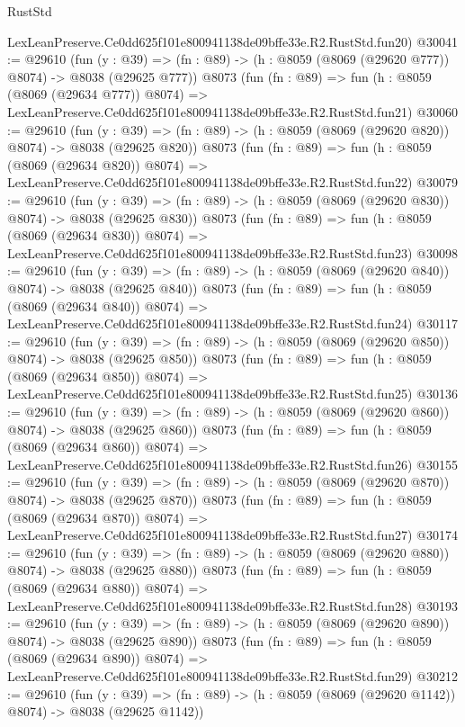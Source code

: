 \begin{lexlean}{RustStd}
\begin{coremodule}
    LexLeanPreserve.Ce0dd625f101e800941138de09bffe33e.R2.RustStd.fun20)
@30041 := @29610
    (fun (y : @39) => (fn : @89) -> (h : @8059 (@8069 (@29620 @777)) @8074) -> @8038 (@29625 @777))
    @8073
    (fun (fn : @89) =>
    fun (h : @8059 (@8069 (@29634 @777)) @8074) =>
    LexLeanPreserve.Ce0dd625f101e800941138de09bffe33e.R2.RustStd.fun21)
@30060 := @29610
    (fun (y : @39) => (fn : @89) -> (h : @8059 (@8069 (@29620 @820)) @8074) -> @8038 (@29625 @820))
    @8073
    (fun (fn : @89) =>
    fun (h : @8059 (@8069 (@29634 @820)) @8074) =>
    LexLeanPreserve.Ce0dd625f101e800941138de09bffe33e.R2.RustStd.fun22)
@30079 := @29610
    (fun (y : @39) => (fn : @89) -> (h : @8059 (@8069 (@29620 @830)) @8074) -> @8038 (@29625 @830))
    @8073
    (fun (fn : @89) =>
    fun (h : @8059 (@8069 (@29634 @830)) @8074) =>
    LexLeanPreserve.Ce0dd625f101e800941138de09bffe33e.R2.RustStd.fun23)
@30098 := @29610
    (fun (y : @39) => (fn : @89) -> (h : @8059 (@8069 (@29620 @840)) @8074) -> @8038 (@29625 @840))
    @8073
    (fun (fn : @89) =>
    fun (h : @8059 (@8069 (@29634 @840)) @8074) =>
    LexLeanPreserve.Ce0dd625f101e800941138de09bffe33e.R2.RustStd.fun24)
@30117 := @29610
    (fun (y : @39) => (fn : @89) -> (h : @8059 (@8069 (@29620 @850)) @8074) -> @8038 (@29625 @850))
    @8073
    (fun (fn : @89) =>
    fun (h : @8059 (@8069 (@29634 @850)) @8074) =>
    LexLeanPreserve.Ce0dd625f101e800941138de09bffe33e.R2.RustStd.fun25)
@30136 := @29610
    (fun (y : @39) => (fn : @89) -> (h : @8059 (@8069 (@29620 @860)) @8074) -> @8038 (@29625 @860))
    @8073
    (fun (fn : @89) =>
    fun (h : @8059 (@8069 (@29634 @860)) @8074) =>
    LexLeanPreserve.Ce0dd625f101e800941138de09bffe33e.R2.RustStd.fun26)
@30155 := @29610
    (fun (y : @39) => (fn : @89) -> (h : @8059 (@8069 (@29620 @870)) @8074) -> @8038 (@29625 @870))
    @8073
    (fun (fn : @89) =>
    fun (h : @8059 (@8069 (@29634 @870)) @8074) =>
    LexLeanPreserve.Ce0dd625f101e800941138de09bffe33e.R2.RustStd.fun27)
@30174 := @29610
    (fun (y : @39) => (fn : @89) -> (h : @8059 (@8069 (@29620 @880)) @8074) -> @8038 (@29625 @880))
    @8073
    (fun (fn : @89) =>
    fun (h : @8059 (@8069 (@29634 @880)) @8074) =>
    LexLeanPreserve.Ce0dd625f101e800941138de09bffe33e.R2.RustStd.fun28)
@30193 := @29610
    (fun (y : @39) => (fn : @89) -> (h : @8059 (@8069 (@29620 @890)) @8074) -> @8038 (@29625 @890))
    @8073
    (fun (fn : @89) =>
    fun (h : @8059 (@8069 (@29634 @890)) @8074) =>
    LexLeanPreserve.Ce0dd625f101e800941138de09bffe33e.R2.RustStd.fun29)
@30212 := @29610
    (fun (y : @39) =>
    (fn : @89) -> (h : @8059 (@8069 (@29620 @1142)) @8074) -> @8038 (@29625 @1142))

\end{coremodule}
\end{lexlean}
